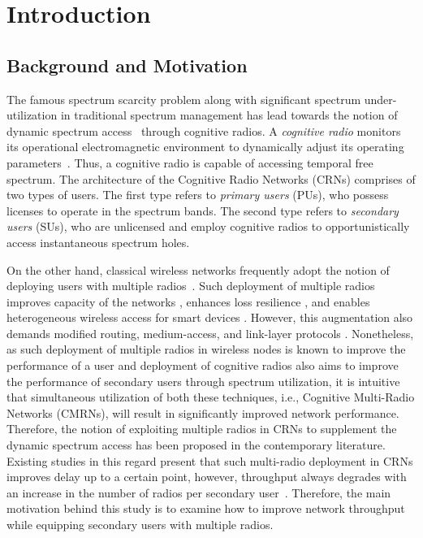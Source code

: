 \chapter{Introduction}\label{intro}
\section{Background and Motivation}
The famous spectrum scarcity problem along with significant spectrum under-utilization in traditional spectrum management has lead towards the notion of dynamic spectrum access~\cite{akyildiz2006next} through cognitive radios. A \textit{cognitive radio} monitors its operational electromagnetic environment to dynamically adjust its operating parameters~\cite{Mitola}. Thus, a cognitive radio is capable of accessing temporal free spectrum. The architecture of the Cognitive Radio Networks (CRNs) comprises of two types of users. The first type refers to \textit{primary users} (PUs), who possess licenses to operate in the spectrum bands. The second type refers to \textit{secondary users} (SUs), who are unlicensed and employ cognitive radios to opportunistically access instantaneous spectrum holes.


On the other hand, classical wireless networks frequently adopt the notion of deploying users with multiple radios~\cite{bahl2004reconsidering, adya2004multi}. Such deployment of multiple radios improves capacity of the networks \cite{draves2004routing, bahl2004reconsidering}, enhances loss resilience \cite{miu2005improving}, and enables heterogeneous wireless access for smart devices \cite{song2012performance}. However, this augmentation also demands modified routing, medium-access, and link-layer protocols \cite{kyasanur2006routing, chatterjee2013low}. Nonetheless, as such deployment of multiple radios in wireless nodes is known to improve the performance of a user and  deployment of cognitive radios also aims to improve the performance of secondary users through spectrum utilization, it is intuitive that simultaneous utilization of both these techniques, i.e., Cognitive Multi-Radio Networks (CMRNs), will result in significantly improved network performance. Therefore, the notion of exploiting multiple radios in CRNs to supplement the dynamic spectrum access has been proposed in the contemporary literature. Existing studies in this regard present that such multi-radio deployment in CRNs improves delay up to a certain point, however, throughput always degrades with an increase in the number of radios per secondary user~\cite{khan2015towards}. Therefore, the main motivation behind this study is to examine how to improve network throughput while equipping secondary users with multiple radios.

